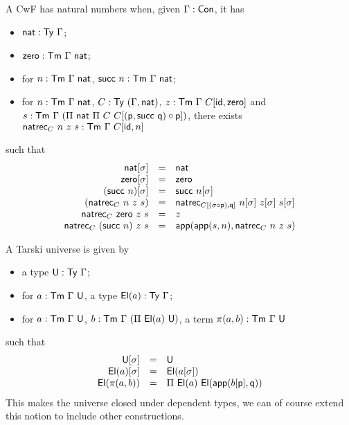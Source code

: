 A \acrshort{CwF} has natural numbers when, given \(\Gamma : \mathsf{Con}\), it has
\begin{itemize}
  \item \(\mathsf{nat} : \mathsf{Ty}\ \Gamma\);
  \item \(\czero : \CTm\ \Ga\ \nat\);
  \item for \(n : \mathsf{Tm}\ \Gamma\ \mathsf{nat}\), \(\mathsf{succ}\ n : \mathsf{Tm}\ \Gamma\ \mathsf{nat}\);
  \item for \(n : \mathsf{Tm}\ \Gamma\ \mathsf{nat}\), \(C : \mathsf{Ty}\ (\Gamma, \mathsf{nat})\),
  \(z : \mathsf{Tm}\ \Gamma\ C[\mathsf{id}, \mathsf{zero}]\) and
  \(s : \CTm\ \Ga\ (\Pi\ \nat\ \Pi\ C\ C[(\pp, \csucc\ \pq) \circ \pp])\),
  there exists \(\mathsf{natrec}_C\ n\ z\ s : \mathsf{Tm}\ \Gamma\ C[\mathsf{id}, n]\)
\end{itemize}
such that
\[
  \begin{array}{rcl}
    \nat[\sigma] &=& \nat \\
    \czero[\sigma] &=& \czero \\
    (\csucc\ n)[\sigma] &=& \csucc\ n[\sigma] \\
    (\natrec_C\ n\ z\ s) &=&
    \natrec_{C[(\sigma \circ \pp), \pq]}\ n[\sigma]\ z[\sigma]\ s[\sigma] \\
    \natrec_C\ \czero\ z\ s &=& z \\
    \natrec_C\ (\csucc\ n)\ z\ s &=& \capp(\capp(s,n), \natrec_C\ n\ z\ s)
  \end{array}
\]


A Tarski universe is given by
\begin{itemize}
  \item a type \(\CU : \CTy\ \Ga\);
  \item for \(a : \mathsf{Tm}\ \Gamma\ \mathsf{U}\), a type \(\mathsf{El}(a) : \mathsf{Ty}\ \Gamma\);
  \item for \(a : \mathsf{Tm}\ \Gamma\ \mathsf{U}\), \(b : \mathsf{Tm}\ \Gamma\ (\Pi\ \mathsf{El}(a)\ \mathsf{U})\),
  a term \(\pi(a,b) : \mathsf{Tm}\ \Gamma\ \mathsf{U}\)
\end{itemize}
such that
\[
  \begin{array}{rcl}
    \mathsf{U}[\sigma] &=& \mathsf{U} \\
    \mathsf{El}(a)[\sigma] &=& \mathsf{El}(a[\sigma]) \\
    \mathsf{El}(\pi(a,b)) &=& \Pi\ \mathsf{El}(a)\ \mathsf{El}(\mathsf{app}(b[\mathsf{p}], \mathsf{q}))
  \end{array}
\]
This makes the universe closed under dependent types, we can of course extend
this notion to include other constructions.


